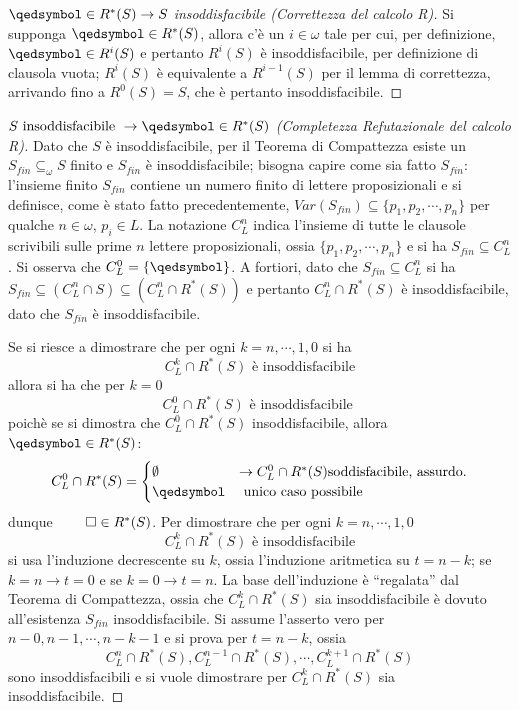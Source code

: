 \begin{proof}[$\qedsymbol \in R^*(S) \rightarrow S$ insoddisfacibile (Correttezza del calcolo R)]
        Si supponga $\qedsymbol \in R^*(S)$, allora c'è un $i \in \omega$ tale 
        per cui, per definizione, $\qedsymbol \in R^i(S)$ e pertanto 
        $R^i(S)$ è insoddisfacibile, per definizione di clausola vuota; 
        $R^i(S)$ è equivalente a $R^{i-1}(S)$ per il lemma di correttezza, 
        arrivando fino a $R^0(S) = S$, che è pertanto insoddisfacibile.
\end{proof}
\begin{proof}[$S \text{ insoddisfacibile } \rightarrow \qedsymbol \in R^*(S)$ (Completezza Refutazionale del calcolo R)]
        Dato che $S$ è insoddisfacibile, per il Teorema di Compattezza esiste 
        un $S_{fin} \subseteq_{\omega} S$ finito e $S_{fin}$ è insoddisfacibile; 
        bisogna capire come sia fatto $S_{fin}$: l'insieme finito $S_{fin}$ contiene 
        un numero finito di lettere proposizionali e si definisce, come è stato fatto 
        precedentemente,
        $Var(S_{fin}) \subseteq \{p_1, p_2, \cdots, p_n\}$ per qualche $n \in  \omega$, 
        $p_i \in L$.
        La notazione $C^{n}_L$ indica l'insieme di tutte le clausole scrivibili 
        sulle prime $n$ lettere proposizionali, ossia $\{p_1, p_2, \cdots, p_n\}$  
        e si ha $S_{fin} \subseteq C^{n}_L$. 
        Si osserva che $C^{0}_L = \{ \qedsymbol \}$. A fortiori, dato che 
        $S_{fin} \subseteq C^{n}_L$ si ha $S_{fin} \subseteq (C^{n}_L \cap S) \subseteq (C_L^{n} \cap R^*(S))$
        e pertanto $C^{n}_L \cap R^*(S)$ è insoddisfacibile, dato che $S_{fin}$ è 
        insoddisfacibile. 

        Se si riesce a dimostrare che per ogni $ k = n, \cdots, 1,0$ si ha 
        $$
        C^k_L \cap R^*(S) \text{ è insoddisfacibile}
        $$
        allora si ha che per $k = 0$
        $$
        C^{0}_L \cap R^*(S) \text{ è insoddisfacibile }
        $$
        poichè se si dimostra che $C^0_L \cap R^*(S)$ 
        insoddisfacibile, allora $\qedsymbol \in R^*(S)$: 
        $$
        C^{0}_L \cap R^*(S) = 
        \begin{cases}
        \emptyset  & \rightarrow C^0_L \cap R^*(S) \text{soddisfacibile, assurdo.} \\
        \qedsymbol & \text{ unico caso possibile }
        \end{cases}
        $$
        dunque $\qed \in R^*(S)$. Per dimostrare che 
        per ogni $k = n, \cdots, 1, 0$ 
        $$
        C^k_L \cap R^*(S) \text{ è insoddisfacibile} 
        $$
        si usa l'induzione decrescente su $k$, ossia l'induzione aritmetica 
        su $t = n - k$; se $k = n \rightarrow t = 0$ e se $k = 0 \rightarrow t = n$. 
        La base dell'induzione è ``regalata'' dal Teorema di Compattezza, 
        ossia che $C^k_L \cap R^*(S)$ sia insoddisfacibile è dovuto all'esistenza $S_{fin}$ 
        insoddisfacibile. Si assume l'asserto vero per $n-0, n-1, \cdots,n-k-1 $ e 
        si prova per $t=n-k$, ossia 
        $$
        C^n_L \cap R^*(S), C^{n-1}_L \cap R^*(S), \cdots, C^{k+1}_L \cap R^*(S)
        $$
        sono insoddisfacibili e si vuole dimostrare per $C^k_L \cap R^*(S)$ sia 
        insoddisfacibile. 


\end{proof}
